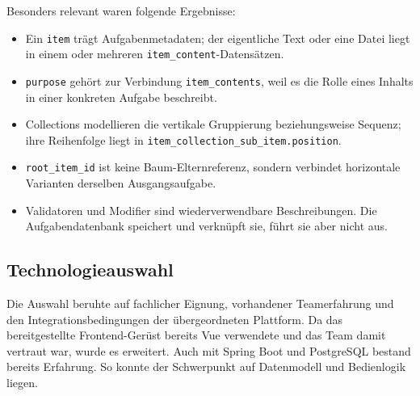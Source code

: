 ﻿\documentclass[11pt,a4paper]{article}
\begin{document}
Besonders relevant waren folgende Ergebnisse:
\begin{itemize}
\item Ein \texttt{item} trägt Aufgabenmetadaten; der eigentliche Text oder
eine Datei liegt in einem oder mehreren \texttt{item\_content}-Datensätzen.
\item \texttt{purpose} gehört zur Verbindung
\texttt{item\_contents}, weil es die Rolle eines Inhalts in einer konkreten
Aufgabe beschreibt.
\item Collections modellieren die vertikale Gruppierung beziehungsweise
Sequenz; ihre Reihenfolge liegt in
\texttt{item\_collection\_sub\_item.position}.
\item \texttt{root\_item\_id} ist keine Baum-Elternreferenz, sondern verbindet
horizontale Varianten derselben Ausgangsaufgabe.
\item Validatoren und Modifier sind wiederverwendbare Beschreibungen. Die
Aufgabendatenbank speichert und verknüpft sie, führt sie aber nicht aus.
\end{itemize}

\subsection{Technologieauswahl}
Die Auswahl beruhte auf fachlicher Eignung, vorhandener Teamerfahrung und den
Integrationsbedingungen der übergeordneten Plattform. Da das bereitgestellte
Frontend-Gerüst bereits Vue verwendete und das Team damit vertraut war, wurde
es erweitert. Auch mit Spring Boot
und PostgreSQL bestand bereits Erfahrung. So konnte der Schwerpunkt auf
Datenmodell und Bedienlogik liegen.
\end{document}
